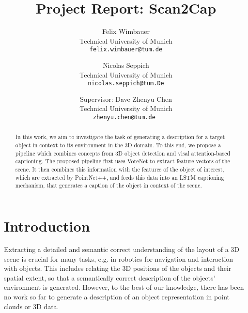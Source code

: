 \documentclass[10pt,twocolumn,letterpaper]{article}
\begin{document}
\title{Project Report: Scan2Cap}

\author{Felix Wimbauer\\
Technical University of Munich\\
{\tt\small felix.wimbauer@tum.de}
\and
Nicolas Seppich\\
Technical University of Munich\\
{\tt\small nicolas.seppich@tum.De}
\and

\small
Supervisor: Dave Zhenyu Chen\\
\small
Technical University of Munich\\
{\tt\small zhenyu.chen@tum.de }
}

\maketitle

\begin{abstract}
In this work, we aim to investigate the task of generating a description for a target object in context to its environment in the 3D domain. To this end, we propose a pipeline which combines concepts from 3D object detection and visal attention-based captioning. The proposed pipeline first uses VoteNet to extract feature vectors of the scene. It then combines this information with the features of the object of interest, which are extracted by PointNet++, and feeds this data into an LSTM captioning mechanism, that generates a caption of the object in context of the scene.  
   
\end{abstract}

\section{Introduction}

Extracting a detailed and semantic correct understanding of the layout of a 3D scene is crucial for many tasks, e.g. in robotics for navigation and interaction with objects. This includes relating the 3D positions of the objects and their spatial extent, so that a semantically correct description of the objects' environment is generated.
However, to the best of our knowledge, there has been no work so far to generate a description of an object representation in point clouds or 3D data.
\end{document}
